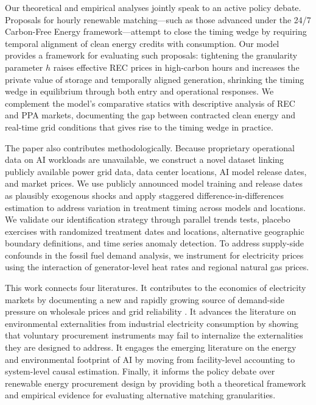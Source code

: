 \documentclass[a4paper,fleqn,longmktitle]{cas-sc}
\begin{document}
Our theoretical and empirical analyses jointly speak to an active policy debate. Proposals for hourly renewable matching---such as those advanced under the 24/7 Carbon-Free Energy framework---attempt to close the timing wedge by requiring temporal alignment of clean energy credits with consumption. Our model provides a framework for evaluating such proposals: tightening the granularity parameter $h$ raises effective REC prices in high-carbon hours and increases the private value of storage and temporally aligned generation, shrinking the timing wedge in equilibrium through both entry and operational responses. We complement the model's comparative statics with descriptive analysis of REC and PPA markets, documenting the gap between contracted clean energy and real-time grid conditions that gives rise to the timing wedge in practice.
 
The paper also contributes methodologically. Because proprietary operational data on AI workloads are unavailable, we construct a novel dataset linking publicly available power grid data, data center locations, AI model release dates, and market prices. We use publicly announced model training and release dates as plausibly exogenous shocks and apply staggered difference-in-differences estimation \citep{cengiz2019effect, deshpande2019screened} to address variation in treatment timing across models and locations. We validate our identification strategy through parallel trends tests, placebo exercises with randomized treatment dates and locations, alternative geographic boundary definitions, and time series anomaly detection. To address supply-side confounds in the fossil fuel demand analysis, we instrument for electricity prices using the interaction of generator-level heat rates and regional natural gas prices.
 
This work connects four literatures. It contributes to the economics of electricity markets by documenting a new and rapidly growing source of demand-side pressure on wholesale prices and grid reliability \citep{borenstein2002trouble, joskow2008capacity}. It advances the literature on environmental externalities from industrial electricity consumption \citep{fowlie2012industrial, greenstone2014environmental} by showing that voluntary procurement instruments may fail to internalize the externalities they are designed to address. It engages the emerging literature on the energy and environmental footprint of AI \citep{strubell19, schwartz2020green, morrison2025holistically} by moving from facility-level accounting to system-level causal estimation. Finally, it informs the policy debate over renewable energy procurement design \citep{miller2022hourly} by providing both a theoretical framework and empirical evidence for evaluating alternative matching granularities.
 
\end{document}
